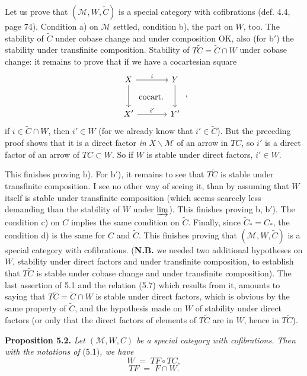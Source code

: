 \documentclass[11pt]{article}
\newcommand{\printedpage}[1]{\marginpar{\footnotesize p.~#1}}
\newcommand{\msp}[1]{\marginpar{\footnotesize [#1]}}
\begin{document}
Let us prove that $(\mathcal{M}, W, \tilde{C})$ is a special category with cofibrations (def. 4.4, page 74). Condition a) on $\mathcal{M}$ settled, condition b), the part on $W$, too. The stability of $\tilde{C}$ under cobase change and under composition OK, also (for b$'$) the stability under transfinite composition. Stability of $T\tilde{C} = \tilde{C} \cap W$ under cobase change: it remains to prove that if we have a cocartesian square
\[
\begin{tikzcd}[row sep=large, column sep=large]
X \arrow[r, "i"] \arrow[d] \arrow[dr, phantom, "\text{cocart.}"] & Y \arrow[d] \\
X' \arrow[r, "i'"] & Y'
\end{tikzcd} \; ,
\]
if $i \in \tilde{C}\cap W$, then $i' \in W$ (for we already know that $i' \in \tilde{C}$). But the preceding proof shows that it is a direct factor \textit{in} $X\backslash\mathcal{M}$ of an arrow in $TC$, so $i'$ is a direct factor of an arrow of $TC \subset W$. So if $W$ is stable under direct factors, $i' \in W$.

\printedpage{43}
\msp{page 86}

This finishes proving b). For b$'$), it remains to see that $T\tilde{C}$ is stable under transfinite composition. I see no other way of seeing it, than by assuming that $W$ itself is stable under transfinite composition (which seems scarcely less demanding than the stability of $W$ under $\varinjlim$). This finishes proving b, b$'$). The condition c) on $C$ implies the same condition on $\tilde{C}$. Finally, since $\tilde{C}_{*} = C_{*}$, the condition d) is the same for $C$ and $\tilde{C}$. This finishes proving that $(\mathcal{M}, W, \tilde{C})$ is a special category with cofibrations. (\textbf{N.B.} we needed two additional hypotheses on $W$, stability under direct factors and under transfinite composition, to establish that $T\tilde{C}$ is stable under cobase change and under transfinite composition). The last assertion of 5.1 and the relation (5.7) which results from it, amounts to saying that $T\tilde{C} = \tilde{C} \cap W$ is stable under direct factors, which is obvious by the same property of $\tilde{C}$, and the hypothesis made on $W$ of stability under direct factors (or only that the direct factors of elements of $T\tilde{C}$ are in $W$, hence in $T\tilde{C}$). %

\msp{page 87}

\textbf{Proposition 5.2.} \textit{Let $(\mathcal{M}, W, C)$ be a special category with cofibrations. Then with the notations of} (5.1)\textit{, we have}
\[
W \;=\; TF \circ TC,
\tag*{(5.8)}
\]
\[
TF \;=\; F \cap W.
\tag*{(5.9)}
\]
\end{document}
